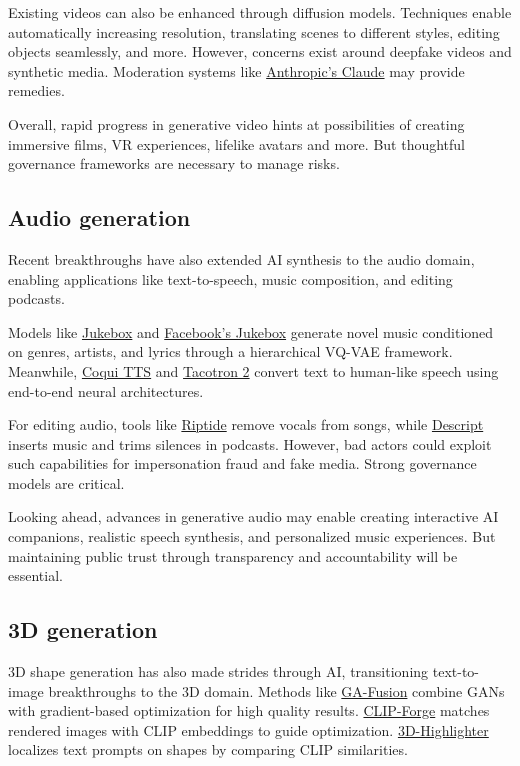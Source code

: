 Existing videos can also be enhanced through diffusion models. Techniques enable automatically increasing resolution, translating scenes to different styles, editing objects seamlessly, and more. However, concerns exist around deepfake videos and synthetic media. Moderation systems like \href{https://www.anthropic.com}{Anthropic's Claude} may provide remedies.

Overall, rapid progress in generative video hints at possibilities of creating immersive films, VR experiences, lifelike avatars and more. But thoughtful governance frameworks are necessary to manage risks.

\subsection{Audio generation}

Recent breakthroughs have also extended AI synthesis to the audio domain, enabling applications like text-to-speech, music composition, and editing podcasts.

Models like \href{https://jukebox.openai.com/}{Jukebox} and \href{https://github.com/ facebookresearch/jukebox}{Facebook's Jukebox} generate novel music conditioned on genres, artists, and lyrics through a hierarchical VQ-VAE framework. Meanwhile, \href{https://github.com/coqui-ai/TTS}{Coqui TTS} and \href{https://github.com/NVIDIA/tacotron2}{Tacotron 2} convert text to human-like speech using end-to-end neural architectures.

For editing audio, tools like \href{https://riptide.ai/}{Riptide} remove vocals from songs, while \href{https://www.descript.com/}{Descript} inserts music and trims silences in podcasts. However, bad actors could exploit such capabilities for impersonation fraud and fake media. Strong governance models are critical.

Looking ahead, advances in generative audio may enable creating interactive AI companions, realistic speech synthesis, and personalized music experiences. But maintaining public trust through transparency and accountability will be essential.

\subsection{3D generation}

3D shape generation has also made strides through AI, transitioning text-to-image breakthroughs to the 3D domain. Methods like \href{https://nv-tlabs.github.io/GA-fusion}{GA-Fusion} combine GANs with gradient-based optimization for high quality results. \href{https://github.com/autodeskailab/clip-forge}{CLIP-Forge} matches rendered images with CLIP embeddings to guide optimization. \href{https://threedle.github.io/3dhighlighter}{3D-Highlighter} localizes text prompts on shapes by comparing CLIP similarities.


